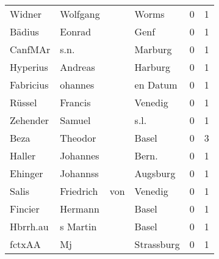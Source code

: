 \begin{tabular}{llllrr}
                   Widner &                           Wolfgang &             &                                       Worms &          0 &         1 \\
                   Bädius &                             Eonrad &             &                                        Genf &          0 &         1 \\
                  CanfMAr &                               s.n. &             &                                     Marburg &          0 &         1 \\
                 Hyperius &                            Andreas &             &                                     Harburg &          0 &         1 \\
                Fabricius &                            ohannes &             &                                    en Datum &          0 &         1 \\
                   Rüssel &                            Francis &             &                                     Venedig &          0 &         1 \\
                 Zehender &                             Samuel &             &                                        s.l. &          0 &         1 \\
                     Beza &                            Theodor &             &                                       Basel &          0 &         3 \\
                   Haller &                           Johannes &             &                                      Bern.  &          0 &         1 \\
                  Ehinger &                           Johannss &             &                                    Augsburg &          0 &         1 \\
                    Salis &                          Friedrich &         von &                                     Venedig &          0 &         1 \\
                  Fincier &                            Hermann &             &                                       Basel &          0 &         1 \\
                 Hbrrh.au &                           s Martin &             &                                       Basel &          0 &         1 \\
                   fctxAA &                                 Mj &             &                                  Strassburg &          0 &         1 \\

\end{tabular}
